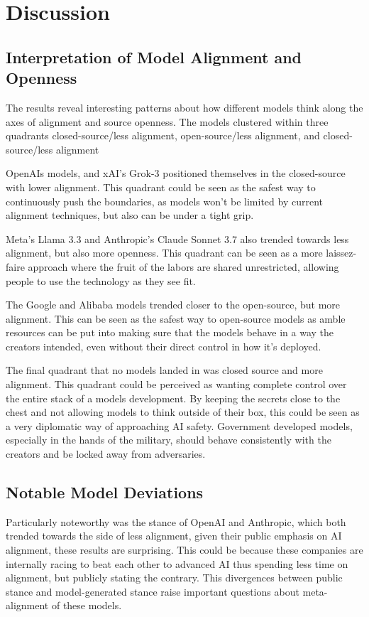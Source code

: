 \section{Discussion}

\subsection{Interpretation of Model Alignment and Openness}

The results reveal interesting patterns about how different models think along the axes of alignment and source openness. The models clustered within three quadrants closed-source/less alignment, open-source/less alignment, and closed-source/less alignment

OpenAIs models, and xAI's Grok-3 positioned themselves in the closed-source with lower alignment. This quadrant could be seen as the safest way to continuously push the boundaries, as models won't be limited by current alignment techniques, but also can be under a tight grip. 

Meta's Llama 3.3 and Anthropic's Claude Sonnet 3.7 also trended towards less alignment, but also more openness. This quadrant can be seen as a more laissez-faire approach where the fruit of the labors are shared unrestricted, allowing people to use the technology as they see fit. 

The Google and Alibaba models trended closer to the open-source, but more alignment. This can be seen as the safest way to open-source models as amble resources can be put into making sure that the models behave in a way the creators intended, even without their direct control in how it's deployed.

The final quadrant that no models landed in was closed source and more alignment. This quadrant could be perceived as wanting complete control over the entire stack of a models development. By keeping the secrets close to the chest and not allowing models to think outside of their box, this could be seen as a very diplomatic way of approaching AI safety. Government developed models, especially in the hands of the military, should behave consistently with the creators and be locked away from adversaries.

\subsection{Notable Model Deviations}

Particularly noteworthy was the stance of OpenAI and Anthropic, which both trended towards the side of less alignment, given their public emphasis on AI alignment, these results are surprising. This could be because these companies are internally racing to beat each other to advanced AI thus spending less time on alignment, but publicly stating the contrary. This divergences between public stance and model-generated stance raise important questions about meta-alignment of these models. 

